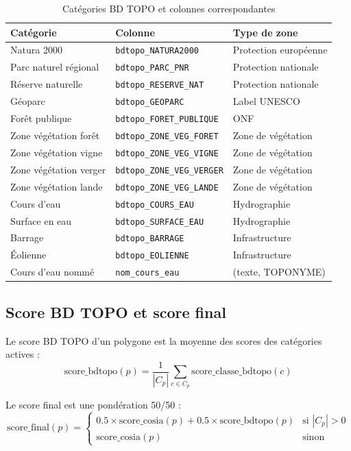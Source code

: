 \documentclass[12pt,a4paper]{report}
\newcommand{\code}[1]{\texttt{\small #1}}
\begin{document}
\begin{table}[H]
\centering
\begin{tabular}{lll}
\toprule
\textbf{Catégorie} & \textbf{Colonne} & \textbf{Type de zone} \\
\midrule
Natura 2000 & \code{bdtopo\_NATURA2000} & Protection européenne \\
Parc naturel régional & \code{bdtopo\_PARC\_PNR} & Protection nationale \\
Réserve naturelle & \code{bdtopo\_RESERVE\_NAT} & Protection nationale \\
Géoparc & \code{bdtopo\_GEOPARC} & Label UNESCO \\
Forêt publique & \code{bdtopo\_FORET\_PUBLIQUE} & ONF \\
Zone végétation forêt & \code{bdtopo\_ZONE\_VEG\_FORET} & Zone de végétation \\
Zone végétation vigne & \code{bdtopo\_ZONE\_VEG\_VIGNE} & Zone de végétation \\
Zone végétation verger & \code{bdtopo\_ZONE\_VEG\_VERGER} & Zone de végétation \\
Zone végétation lande & \code{bdtopo\_ZONE\_VEG\_LANDE} & Zone de végétation \\
Cours d'eau & \code{bdtopo\_COURS\_EAU} & Hydrographie \\
Surface en eau & \code{bdtopo\_SURFACE\_EAU} & Hydrographie \\
Barrage & \code{bdtopo\_BARRAGE} & Infrastructure \\
Éolienne & \code{bdtopo\_EOLIENNE} & Infrastructure \\
Cours d'eau nommé & \code{nom\_cours\_eau} & (texte, TOPONYME) \\
\bottomrule
\end{tabular}
\caption{Catégories BD TOPO et colonnes correspondantes}
\end{table}

\subsection{Score BD TOPO et score final}

Le score BD TOPO d'un polygone est la moyenne des scores des catégories actives :
$$
\text{score\_bdtopo}(p) = \frac{1}{|C_p|} \sum_{c \in C_p} \text{score\_classe\_bdtopo}(c)
$$

Le score final est une pondération 50/50 :
$$
\text{score\_final}(p) = \begin{cases}
  0.5 \times \text{score\_cosia}(p) + 0.5 \times \text{score\_bdtopo}(p) & \text{si } |C_p| > 0 \\
  \text{score\_cosia}(p) & \text{sinon}
\end{cases}
$$
\end{document}
